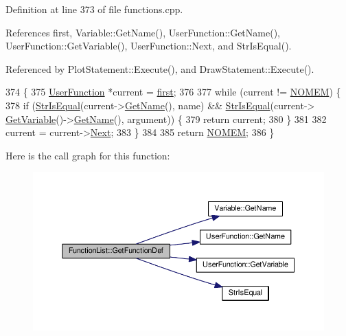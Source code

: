 Definition at line 373 of file functions.\+cpp.



References first, Variable\+::\+Get\+Name(), User\+Function\+::\+Get\+Name(), User\+Function\+::\+Get\+Variable(), User\+Function\+::\+Next, and Str\+Is\+Equal().



Referenced by Plot\+Statement\+::\+Execute(), and Draw\+Statement\+::\+Execute().


\begin{DoxyCode}
374 \{
375     \hyperlink{classUserFunction}{UserFunction} *current = \hyperlink{classFunctionList_a4a0534f4240022c58c3e06234e7f9f99}{first};
376 
377     \textcolor{keywordflow}{while} (current != \hyperlink{platform_8h_a46ff2bfbf0d44b8466a2251d5bd5e6f8}{NOMEM}) \{
378         \textcolor{keywordflow}{if} (\hyperlink{clib_8h_a2a1f39d11cbbaac992d42e67557dac4b}{StrIsEqual}(current->\hyperlink{classUserFunction_a59c59ebf5b45c5bb4aaa200a1218549d}{GetName}(), name) && \hyperlink{clib_8h_a2a1f39d11cbbaac992d42e67557dac4b}{StrIsEqual}(current->
      \hyperlink{classUserFunction_a4580afdaa5124951a523de07f3c454a6}{GetVariable}()->\hyperlink{classVariable_accf221d35cec8a9707e84891b715fb6c}{GetName}(), argument)) \{
379             \textcolor{keywordflow}{return} current;
380         \}
381 
382         current = current->\hyperlink{classUserFunction_a5463f575d2ed50c0dbe069ec2841a5c9}{Next};
383     \}
384 
385     \textcolor{keywordflow}{return} \hyperlink{platform_8h_a46ff2bfbf0d44b8466a2251d5bd5e6f8}{NOMEM};
386 \}
\end{DoxyCode}


Here is the call graph for this function\+:
\nopagebreak
\begin{figure}[H]
\begin{center}
\leavevmode
\includegraphics[width=350pt]{d1/d79/classFunctionList_a867e5afb83ce8d6ee658290a76f54614_cgraph}
\end{center}
\end{figure}




